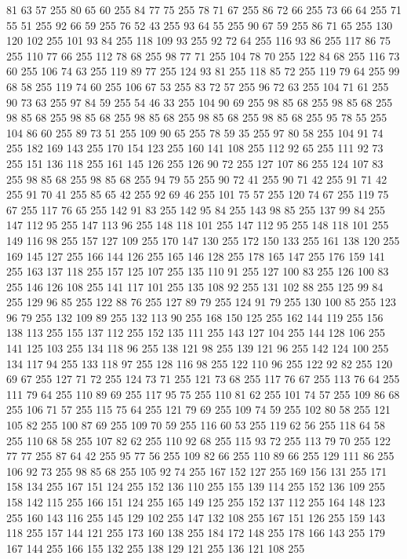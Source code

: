 81 63 57 255 80 65 60 255 84 77 75 255 78 71 67 255 86 72 66 255 73 66 64 255 71 55 51 255 92 66 59 255 76 52 43 255 93 64 55 255 90 67 59 255 86 71 65 255 130 120 102 255 101 93 84 255 118 109 93 255 92 72 64 255 116 93 86 255 117 86 75 255 110 77 66 255 112 78 68 255 98 77 71 255 104 78 70 255 122 84 68 255 116 73 60 255 106 74 63 255 119 89 77 255 124 93 81 255 118 85 72 255 119 79 64 255 99 68 58 255 119 74 60 255 106 67 53 255 83 72 57 255 96 72 63 255 104 71 61 255 90 73 63 255 97 84 59 255 54 46 33 255 104 90 69 255 98 85 68 255 98 85 68 255 98 85 68 255 98 85 68 255 98 85 68 255 98 85 68 255 98 85 68 255 95 78 55 255 104 86 60 255 89 73 51 255 109 90 65 255 78 59 35 255 97 80 58 255 104 91 74 255 182 169 143 255 170 154 123 255 160 141 108 255 112 92 65 255 111 92 73 255 151 136 118 255 161 145 126 255 126 90 72 255 127 107 86 255 124 107 83 255 98 85 68 255
98 85 68 255 94 79 55 255 90 72 41 255 90 71 42 255 91 71 42 255 91 70 41 255 85 65 42 255 92 69 46 255 101 75 57 255 120 74 67 255 119 75 67 255 117 76 65 255 142 91 83 255 142 95 84 255 143 98 85 255 137 99 84 255 147 112 95 255 147 113 96 255 148 118 101 255 147 112 95 255 148 118 101 255 149 116 98 255 157 127 109 255 170 147 130 255 172 150 133 255 161 138 120 255 169 145 127 255 166 144 126 255 165 146 128 255 178 165 147 255 176 159 141 255 163 137 118 255 157 125 107 255 135 110 91 255 127 100 83 255 126 100 83 255 146 126 108 255 141 117 101 255 135 108 92 255 131 102 88 255 125 99 84 255 129 96 85 255 122 88 76 255 127 89 79 255 124 91 79 255 130 100 85 255 123 96 79 255 132 109 89 255 132 113 90 255 168 150 125 255 162 144 119 255 156 138 113 255 155 137 112 255 152 135 111 255 143 127 104 255 144 128 106 255 141 125 103 255 134 118 96 255 138 121 98 255 139 121 96 255 142 124 100 255 134 117 94 255 133 118 97 255 128 116 98 255
122 110 96 255 122 92 82 255 120 69 67 255 127 71 72 255 124 73 71 255 121 73 68 255 117 76 67 255 113 76 64 255 111 79 64 255 110 89 69 255 117 95 75 255 110 81 62 255 101 74 57 255 109 86 68 255 106 71 57 255 115 75 64 255 121 79 69 255 109 74 59 255 102 80 58 255 121 105 82 255 100 87 69 255 109 70 59 255 116 60 53 255 119 62 56 255 118 64 58 255 110 68 58 255 107 82 62 255 110 92 68 255 115 93 72 255 113 79 70 255 122 77 77 255 87 64 42 255 95 77 56 255 109 82 66 255 110 89 66 255 129 111 86 255 106 92 73 255 98 85 68 255 105 92 74 255 167 152 127 255 169 156 131 255 171 158 134 255 167 151 124 255 152 136 110 255 155 139 114 255 152 136 109 255 158 142 115 255 166 151 124 255 165 149 125 255 152 137 112 255 164 148 123 255 160 143 116 255 145 129 102 255 147 132 108 255 167 151 126 255 159 143 118 255 157 144 121 255 173 160 138 255 184 172 148 255 178 166 143 255 179 167 144 255 166 155 132 255 138 129 121 255 136 121 108 255
